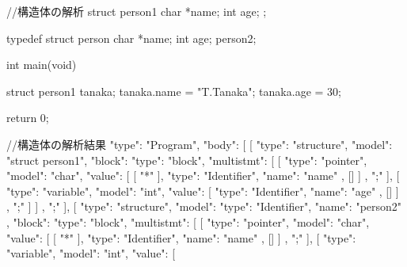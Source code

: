 //構造体の解析
struct person1 {
    char *name;
    int age;
};

typedef struct person {
    char *name;
    int age;
} person2;

int main(void) {
  struct person1 tanaka;
    tanaka.name = "T.Tanaka";
    tanaka.age = 30;
 
    return 0;
}

//構造体の解析結果
{
   "type": "Program",
   "body": [
      [
         {
            "type": "structure",
            "model": "struct person1",
            "block": {
               "type": "block",
               "multistmt": [
                  [
                     {
                        "type": "pointer",
                        "model": "char",
                        "value": [
                           [
                              "*"
                           ],
                           {
                              "type": "Identifier",
                              "name": "name"
                           },
                           []
                        ]
                     },
                     ";"
                  ],
                  [
                     {
                        "type": "variable",
                        "model": "int",
                        "value": [
                           {
                              "type": "Identifier",
                              "name": "age"
                           },
                           []
                        ]
                     },
                     ";"
                  ]
               ]
            }
         },
         ";"
      ],
      [
         {
            "type": "structure",
            "model": {
               "type": "Identifier",
               "name": "person2"
            },
            "block": {
               "type": "block",
               "multistmt": [
                  [
                     {
                        "type": "pointer",
                        "model": "char",
                        "value": [
                           [
                              "*"
                           ],
                           {
                              "type": "Identifier",
                              "name": "name"
                           },
                           []
                        ]
                     },
                     ";"
                  ],
                  [
                     {
                        "type": "variable",
                        "model": "int",
                        "value": [
}}}}
